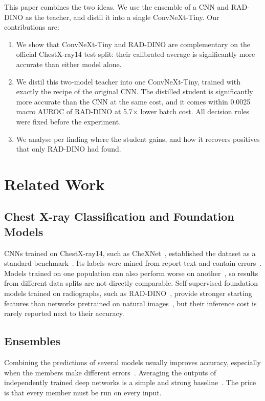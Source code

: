 \documentclass[conference]{IEEEtran}
\begin{document}
This paper combines the two ideas. We use the ensemble of a CNN and RAD-DINO as the teacher, and distil it into a single ConvNeXt-Tiny. Our contributions are:
\begin{enumerate}
  \item We show that ConvNeXt-Tiny and RAD-DINO are complementary on the official ChestX-ray14 test split: their calibrated average is significantly more accurate than either model alone.
  \item We distil this two-model teacher into one ConvNeXt-Tiny, trained with exactly the recipe of the original CNN. The distilled student is significantly more accurate than the CNN at the same cost, and it comes within 0.0025 macro AUROC of RAD-DINO at 5.7$\times$ lower batch cost. All decision rules were fixed before the experiment.
  \item We analyse per finding where the student gains, and how it recovers positives that only RAD-DINO had found.
\end{enumerate}

\section{Related Work}
\label{sec:related}

\subsection{Chest X-ray Classification and Foundation Models}
CNNs trained on ChestX-ray14, such as CheXNet~\cite{rajpurkar2017chexnet}, established the dataset as a standard benchmark~\cite{calli2021deep}. Its labels were mined from report text and contain errors~\cite{oakdenrayner2020exploring}. Models trained on one population can also perform worse on another~\cite{zech2018variable}, so results from different data splits are not directly comparable. Self-supervised foundation models trained on radiographs, such as RAD-DINO~\cite{perezgarcia2025raddino}, provide stronger starting features than networks pretrained on natural images~\cite{deng2009imagenet}, but their inference cost is rarely reported next to their accuracy.

\subsection{Ensembles}
Combining the predictions of several models usually improves accuracy, especially when the members make different errors~\cite{dietterich2000ensemble}. Averaging the outputs of independently trained deep networks is a simple and strong baseline~\cite{lakshminarayanan2017deep}. The price is that every member must be run on every input.
\end{document}
